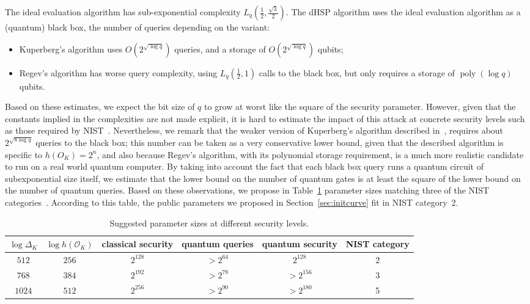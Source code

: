 \documentclass{llncs}
\renewcommand{\O}{\mathcal{O}}
\DeclareMathOperator{\poly}{poly}
\begin{document}
The ideal evaluation algorithm has sub-exponential complexity
$L_q(\frac{1}{2},\frac{\sqrt{3}}{2})$.  The dHSP algorithm uses the
ideal evaluation algorithm as a (quantum) black box, the number of
queries depending on the variant:
\begin{itemize}
\item Kuperberg's algorithm uses $O(2^{\sqrt{\log q}})$ queries, and a
  storage of $O(2^{\sqrt{\log q}})$ qubits;
\item Regev's algorithm has worse query complexity, using
  $L_q(\frac{1}{2},1)$ calls to the black box, but only requires a
  storage of $\poly(\log q)$ qubits.
\end{itemize}

Based on these estimates, we expect the bit size of $q$ to grow at
worst like the square of the security parameter. However, given that
the constants implied in the complexities are not made explicit, it is
hard to estimate the impact of this attack at concrete security levels
such as those required by NIST~\cite{NIST2016}. Nevertheless, we
remark that the weaker version of Kuperberg's algorithm described
in~\cite[§2.1]{regev04}, requires about $2^{\sqrt{8\log q}}$ queries
to the black box; this number can be taken as a very conservative
lower bound, given that the described algorithm is specific to
$h(O_K)=2^n$, and also because Regev's algorithm, with its polynomial
storage requirement, is a much more realistic candidate to run on a
real world quantum computer. By taking into account the fact that each
black box query runs a quantum circuit of subexponential size itself,
we estimate that the lower bound on the number of quantum gates is at
least the square of the lower bound on the number of quantum
queries. Based on these observations, we propose in
Table~\ref{tab:sizes} parameter sizes matching three of the NIST
categories~\cite{NIST2016}.
According to this table, the public parameters we proposed
in Section~\ref{sec:initcurve} fit in NIST category~2.

\begin{table}
    \renewcommand{\arraystretch}{1.4}
    \centering
    \begin{tabular}{c@{\;}|@{\;}c@{\;}|@{\;}c@{\;}|@{\;}c@{\;}|@{\;}c@{\;}|@{\;}c}
        $\log Δ_K$ & $\log h(\O_K)$
        & \parbox{10ex}{\centering classical security}
        & \parbox{10ex}{\centering quantum queries}
        & \parbox{10ex}{\centering quantum security}
        & \parbox{10ex}{\centering NIST category}\\
        \hline
        $512$  & $256$ & $2^{128}$ & $> 2^{64}$ & $2^{128}$ & 2\\
        $768$  & $384$ & $2^{192}$ & $> 2^{78}$ & $> 2^{156}$ & 3\\
        $1024$ & $512$ & $2^{256}$ & $> 2^{90}$ & $> 2^{180}$ & 5
        \\
        \hline
    \end{tabular}
    \smallskip
    \caption{Suggested parameter sizes at different security levels.}
    \label{tab:sizes}
\end{table}
\end{document}
